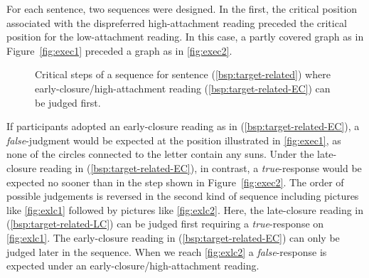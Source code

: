 \documentclass[fleqn,reqno,10pt,draft]{article}
\begin{document}
For each sentence, two sequences were designed. In the first, the
critical position associated with the dispreferred high-attachment
reading preceded the critical position for the low-attachment
reading. In this case, a partly covered graph as in
Figure~\ref{fig:exec1} preceded a graph as in \ref{fig:exec2}.
%
\begin{figure}[ht]
	\centering
	\caption[]{Critical steps of a sequence for sentence
          (\ref{bsp:target-related}) where
          early-closure/high-attachment reading
          (\ref{bsp:target-related-EC}) can be judged first.}
	\label{fig:exec}
\end{figure}
%
If
participants adopted an early-closure reading as in
(\ref{bsp:target-related-EC}), a \emph{false}-judgment would be
expected at the position illustrated in \ref{fig:exec1}, as none of
the circles connected to the letter contain any suns. Under the
late-closure reading in (\ref{bsp:target-related-EC}), in contrast, a
\emph{true}-response would be expected no sooner than in the step
shown in Figure~\ref{fig:exec2}. The order of possible judgements is
reversed in the second kind of sequence including pictures like
\ref{fig:exlc1} followed by pictures like \ref{fig:exlc2}. Here, the
late-closure reading in (\ref{bsp:target-related-LC}) can be judged
first requiring a \emph{true}-response on \ref{fig:exlc1}. The
early-closure reading in (\ref{bsp:target-related-EC}) can only be
judged later in the sequence. When we reach \ref{fig:exlc2} a
\emph{false}-response is expected under an
early-closure/high-attachment reading. 
\end{document}
